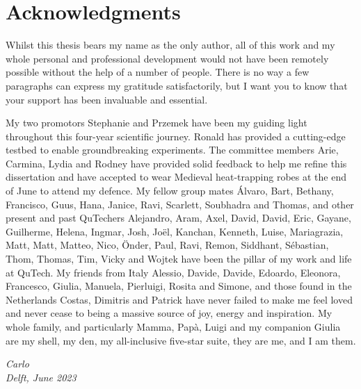 \chapter*{Acknowledgments}

Whilst this thesis bears my name as the only author, all of this work and my whole personal and
professional development would not have been remotely possible without the help of a number of
people. There is no way a few paragraphs can express my gratitude satisfactorily, but I want you to
know that your support has been invaluable and essential.

My two promotors Stephanie and Przemek have been my guiding light throughout this four-year
scientific journey. Ronald has provided a cutting-edge testbed to enable groundbreaking experiments.
The committee members Arie, Carmina, Lydia and Rodney have provided solid feedback to help me refine
this dissertation and have accepted to wear Medieval heat-trapping robes at the end of June to
attend my defence. My fellow group mates Álvaro, Bart, Bethany, Francisco, Guus, Hana, Janice, Ravi,
Scarlett, Soubhadra and Thomas, and other present and past QuTechers Alejandro, Aram, Axel, David,
David, Eric, Gayane, Guilherme, Helena, Ingmar, Josh, Joël, Kanchan, Kenneth, Luise, Mariagrazia,
Matt, Matt, Matteo, Nico, Önder, Paul, Ravi, Remon, Siddhant, Sébastian, Thom, Thomas, Tim, Vicky
and Wojtek have been the pillar of my work and life at QuTech. My friends from Italy Alessio,
Davide, Davide, Edoardo, Eleonora, Francesco, Giulia, Manuela, Pierluigi, Rosita and Simone, and
those found in the Netherlands Costas, Dimitris and Patrick have never failed to make me feel loved
and never cease to being a massive source of joy, energy and inspiration. My whole family, and
particularly Mamma, Papà, Luigi and my companion Giulia are my shell, my den, my all-inclusive
five-star suite, they are me, and I am them.

\begin{flushright}
{\itshape
Carlo \\
Delft, June 2023
}
\end{flushright}
